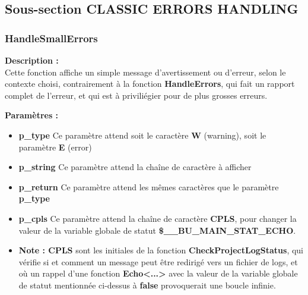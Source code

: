\documentclass[a4paper,10pt]{article}
\begin{document}
\color{green}
\subsection{Sous-section CLASSIC ERRORS HANDLING}\color{white}

\color{blue}
\subsubsection{HandleSmallErrors}\color{white}

\begin{justify}
    \textbf{Description :}\\
    Cette fonction affiche un simple message d'avertissement ou d'erreur, selon le contexte choisi, contrairement à la fonction \textbf{\color{mauve}HandleErrors}, qui fait un rapport complet de l'erreur, et qui est à priviliégier pour de plus grosses erreurs.
\end{justify}

\begin{justify}
    \textbf{Paramètres :}

    \begin{itemize}
        \item \textbf{\color{orange}p\_type} Ce paramètre attend soit le caractère \textbf{W} (warning), soit le paramètre \textbf{E} (error)\\

        \item \textbf{\color{orange}p\_string} Ce paramètre attend la chaîne de caractère à afficher\\

        \item \textbf{\color{orange}p\_return} Ce paramètre attend les mêmes caractères que le paramètre \textbf{\color{orange}p\_type}\\

        \item \textbf{\color{orange}p\_cpls} Ce paramètre attend la chaîne de caractère \textbf{CPLS}, pour changer la valeur de la variable globale de statut \textbf{\color{orange}\$\_\_BU\_MAIN\_STAT\_ECHO}.\\
        
        \item \textbf{Note : CPLS} sont les initiales de la fonction \textbf{\color{mauve}CheckProjectLogStatus}, qui vérifie si et comment un message peut être redirigé vers un fichier de logs, et où un rappel d'une fonction \textbf{\color{mauve}Echo<...>} avec la valeur de la variable globale de statut mentionnée ci-dessus à \textbf{false} provoquerait une boucle infinie.
    \end{itemize}
\end{justify}
\end{document}
